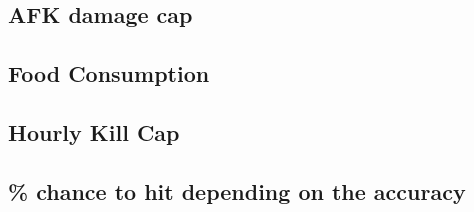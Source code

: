         \subsection{AFK damage cap}
        \subsection{Food Consumption}
        \subsection{Hourly Kill Cap}

        \subsection{\% chance to hit depending on the accuracy}
    